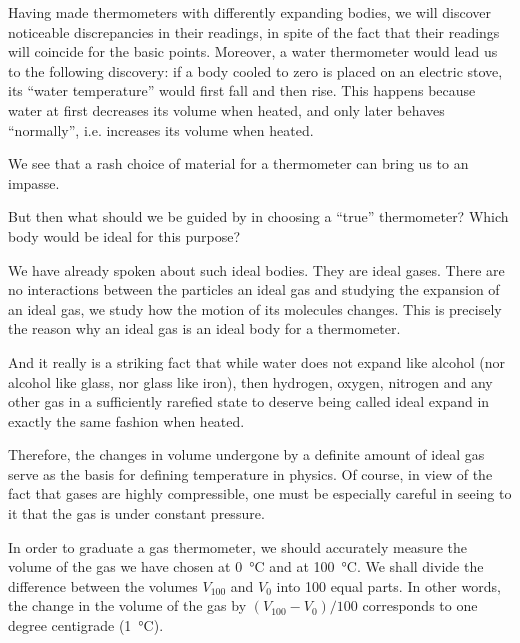 Having made thermometers with differently expand­ing bodies, we will discover noticeable discrepancies in their readings, in spite of the fact that their readings will coincide for the basic points. Moreover, a water thermometer would lead us to the following discovery: if a body cooled to zero is placed on an electric stove, its ``water temperature'' would first fall and then rise. This happens because water at first decreases its volume when heated, and only later behaves ``normally'', i.e. increases its volume when heated.

We see that a rash choice of material for a thermometer can bring us to an impasse.

But then what should we be guided by in choosing a ``true'' thermometer? Which body would be ideal for this purpose?

We have already spoken about such ideal bodies. They are ideal gases. There are no interactions between the particles an ideal gas and studying the expansion of an ideal gas, we study how the motion of its molecules changes. This is precisely the reason why an ideal gas is an ideal body for a thermometer.

And it really is a striking fact that while water does not expand like alcohol (nor alcohol like glass, nor glass like iron), then hydrogen, oxygen, nitrogen and any other gas in a sufficiently rarefied state to deserve being called ideal expand in exactly the same fashion when heated.

Therefore, the changes in volume undergone by a def­inite amount of ideal gas serve as the basis for defining temperature in physics. Of course, in view of the fact that gases are highly compressible, one must be especially careful in seeing to it that the gas is under constant pres­sure.

In order to graduate a gas thermometer, we should accurately measure the volume of the gas we have chosen at \SI{0}{\celsius} and at \SI{100}{\celsius}. We shall divide the difference be­tween the volumes $V_{100}$ and $V_{0}$ into 100 equal parts. In other words, the change in the volume of the gas by $(V_{100} - V_{0})/100$ corresponds to one degree centigrade (\SI{1}{\celsius}).

